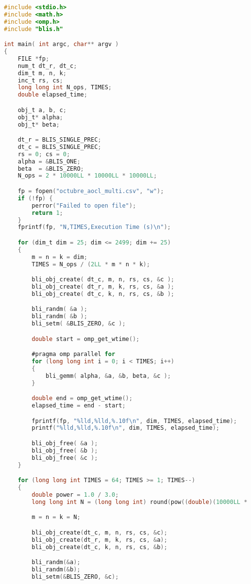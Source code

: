 \begin{lstlisting}[language=C]
#include <stdio.h>
#include <math.h>
#include <omp.h>
#include "blis.h"

int main( int argc, char** argv )
{
    FILE *fp;
    num_t dt_r, dt_c;
    dim_t m, n, k;
    inc_t rs, cs;
    long long int N_ops, TIMES;
    double elapsed_time;

    obj_t a, b, c;
    obj_t* alpha;
    obj_t* beta;

    dt_r = BLIS_SINGLE_PREC;
    dt_c = BLIS_SINGLE_PREC;
    rs = 0; cs = 0;
    alpha = &BLIS_ONE;
    beta  = &BLIS_ZERO;
    N_ops = 2 * 10000LL * 10000LL * 10000LL;

    fp = fopen("octubre_aocl_multi.csv", "w");
    if (!fp) {
        perror("Failed to open file");
        return 1;
    }
    fprintf(fp, "N,TIMES,Execution Time (s)\n");

    for (dim_t dim = 25; dim <= 2499; dim += 25)
    {
        m = n = k = dim;
        TIMES = N_ops / (2LL * m * n * k);

        bli_obj_create( dt_c, m, n, rs, cs, &c );
        bli_obj_create( dt_r, m, k, rs, cs, &a );
        bli_obj_create( dt_c, k, n, rs, cs, &b );

        bli_randm( &a );
        bli_randm( &b );
        bli_setm( &BLIS_ZERO, &c );

        double start = omp_get_wtime();

        #pragma omp parallel for
        for (long long int i = 0; i < TIMES; i++)
        {
            bli_gemm( alpha, &a, &b, beta, &c );
        }

        double end = omp_get_wtime();
        elapsed_time = end - start;

        fprintf(fp, "%lld,%lld,%.10f\n", dim, TIMES, elapsed_time);
        printf("%lld,%lld,%.10f\n", dim, TIMES, elapsed_time);

        bli_obj_free( &a );
        bli_obj_free( &b );
        bli_obj_free( &c );
    }

    for (long long int TIMES = 64; TIMES >= 1; TIMES--)
    {
        double power = 1.0 / 3.0;
        long long int N = (long long int) round(pow((double)(10000LL * 10000LL * 10000LL) / TIMES, power));

        m = n = k = N;

        bli_obj_create(dt_c, m, n, rs, cs, &c);
        bli_obj_create(dt_r, m, k, rs, cs, &a);
        bli_obj_create(dt_c, k, n, rs, cs, &b);

        bli_randm(&a);
        bli_randm(&b);
        bli_setm(&BLIS_ZERO, &c);


\end{lstlisting}

